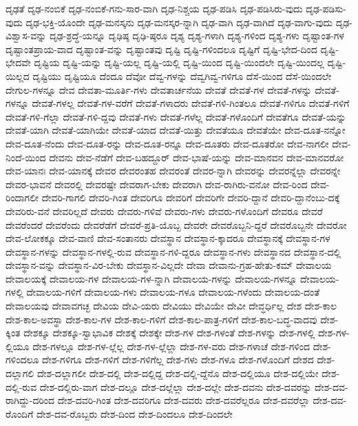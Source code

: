 {ದೃಢತೆ
ದೃಢ-ನಂಬಿಕೆ
ದೃಢ-ನಂಬಿಕೆ-ಗನು-ಸಾರ-ವಾಗಿ
ದೃಢ-ನಿಶ್ಚಯ
ದೃಢ-ಪಡಿಸಿ
ದೃಢ-ಪಡಿಸಿರು-ವುದು
ದೃಢ-ಪಡಿಸು-ವುದು
ದೃಢ-ಭಕ್ತಿ-ಯೊಂದೇ
ದೃಢ-ಮನಸ್ಕನು
ದೃಢ-ಮನಸ್ಕರ-ನ್ನಾಗಿ
ದೃಢ-ವಾಗಿ
ದೃಢ-ವಾಗಿದೆ
ದೃಢ-ವಾಗು-ವುದು
ದೃಢ-ವಿಶ್ವಾಸ-ವನ್ನು
ದೃಢ-ಶ್ರದ್ಧೆ-ಯನ್ನೂ
ದೃಢಿಷ್ಠ
ದೃಢಿ-ಷ್ಠರೂ
ದೃಶ್ಯ
ದೃಶ್ಯ-ಗಳಾಗಿ
ದೃಶ್ಯ-ಗಳಿಂದ
ದೃಶ್ಯ-ಗಳು
ದೃಷ್ಟಾಂತ-ಗಳ
ದೃಷ್ಟಾಂತಪ್ರಾಯ-ವಾದ
ದೃಷ್ಟಾಂತ-ವನ್ನು
ದೃಷ್ಟಾಂತವು
ದೃಷ್ಟಿ
ದೃಷ್ಟಿ-ಗಳಿಂದಲೂ
ದೃಷ್ಟಿಗೆ
ದೃಷ್ಟಿ-ಭೇದ-ದಿಂದ
ದೃಷ್ಟಿ-ಭೇದವೇ
ದೃಷ್ಟಿಯ
ದೃಷ್ಟಿ-ಯನ್ನು
ದೃಷ್ಟಿ-ಯಲ್ಲ
ದೃಷ್ಟಿ-ಯಲ್ಲಿ
ದೃಷ್ಟಿ-ಯಿಂದ
ದೃಷ್ಟಿ-ಯಿಂದಲೇ
ದೃಷ್ಟಿ-ಯಿಂದಲ್ಲ
ದೃಷ್ಟಿ-ಯಿಲ್ಲದ
ದೃಷ್ಟಿಯು
ದೃಷ್ಟಿಯೂ
ದೆಂದೂ
ದೆವೋ
ದೆವ್ವ-ಗಳನ್ನು
ದೆವ್ವಗಿವ್ವ-ಗಳಿಗೂ
ದೆಸೆ-ಯಿಂದ
ದೆಸೆ-ಯಿಂದಲೇ
ದೇಗುಲ-ಗಳನ್ನೂ
ದೇವ
ದೇವತಾ-ಮೂರ್ತಿ-ಗಳು
ದೇವತಾರ್ಚನೆಯ
ದೇವತೆ
ದೇವತೆ-ಗಳ
ದೇವತೆ-ಗಳನ್ನು
ದೇವತೆ-ಗಳನ್ನೂ
ದೇವತೆ-ಗಳಲ್ಲ
ದೇವತೆ-ಗಳ-ವರೆಗೆ
ದೇವತೆ-ಗಳಾದರು
ದೇವತೆ-ಗಳಿ-ಗಿಂತಲೂ
ದೇವತೆ-ಗಳಿಗೂ
ದೇವತೆ-ಗಳಿಗೆ
ದೇವತೆ-ಗಳಿ-ಗೆಲ್ಲಾ
ದೇವತೆ-ಗಳಿ-ದ್ದವು
ದೇವತೆ-ಗಳು
ದೇವತೆ-ಗಳೆಲ್ಲ
ದೇವತೆ-ಗಳೊಂದಿಗೆ
ದೇವತೆಗೂ
ದೇವತೆ-ಯನ್ನು
ದೇವತೆ-ಯಾಗಿ
ದೇವತೆ-ಯಾಗಿಯೇ
ದೇವತೆ-ಯಾದ
ದೇವತೆ-ಯಿತ್ತು
ದೇವತೆಯೂ
ದೇವತೆಯೇ
ದೇವ-ದೂತ-ನನ್ನೋ
ದೇವ-ದೂತ-ನೆಂದು
ದೇವ-ದೂತ-ರನ್ನು
ದೇವ-ದೂತ-ರನ್ನೂ
ದೇವ-ದೂತರು
ದೇವ-ದೂತರೋ
ದೇವ-ನಾಗಲೀ
ದೇವ-ನಿಂದೆ-ಯಿಂದ
ದೇವನು
ದೇವ-ನೆಡೆಗೆ
ದೇವ-ಬಹದ್ದೂರ್
ದೇವ-ಭಾಷೆ-ಯನ್ನು
ದೇವ-ಮಾನವನ
ದೇವ-ಮಾನವರೋ
ದೇವ-ಯಾನಃ
ದೇವ-ಯಾನಕ್ಕೆ
ದೇವರ
ದೇವರಂತಹ
ದೇವರಂತೆ
ದೇವರ-ನ್ನಾಗಿ
ದೇವರನ್ನು
ದೇವರನ್ನೆಲ್ಲಾ
ದೇವರನ್ನೇ
ದೇವರ-ಭಾವನೆ
ದೇವರಲ್ಲಿ
ದೇವರಷ್ಟೇ
ದೇವರಾಗ-ಬೇಕು
ದೇವರಾಗಿ
ದೇವ-ರಾಗಿರು-ವನೋ
ದೇವ-ರಿಂದ
ದೇವ-ರಿಂದಾಗಲೀ
ದೇವರಿ-ಗಾಗಲಿ
ದೇವರಿ-ಗಿಂತ
ದೇವರಿಗೂ
ದೇವರಿಗೆ
ದೇವರಿಗೇ
ದೇವರಿ-ದ್ದಾನೆ
ದೇವರಿ-ದ್ದಾನೆಂಬು-ದಕ್ಕೆ
ದೇವರಿರು-ವನೆ
ದೇವರಿಲ್ಲದೆ
ದೇವರು
ದೇವರು-ಗಳಿವೆ
ದೇವರು-ಗಳು
ದೇವರು-ಗಳೊಂದಿಗೆ
ದೇವರೂ
ದೇವರೆ
ದೇವರೆಂದರೆ
ದೇವರೆಂದು
ದೇವರೆಡೆಗೆ
ದೇವರೆ-ಪ್ರತಿ-ಯೊಬ್ಬ
ದೇವರೇ
ದೇವರೊಬ್ಬನಿ-ದ್ದರೆ
ದೇವರೊಬ್ಬನೇ
ದೇವರೋ
ದೇವ-ಲೋಕಕ್ಕೂ
ದೇವ-ವಾಣಿ
ದೇವ-ಸಂತಾನರು
ದೇವಸ್ಥಾನ
ದೇವಸ್ಥಾನ-ಕ್ಕಾದರೂ
ದೇವಸ್ಥಾನಕ್ಕೆ
ದೇವಸ್ಥಾನ-ಗಳ
ದೇವಸ್ಥಾನ-ಗಳನ್ನು
ದೇವಸ್ಥಾನ-ಗಳಲ್ಲಿ-ರುವ
ದೇವಸ್ಥಾನ-ಗಳಿ-ದ್ದರೂ
ದೇವಸ್ಥಾನ-ಗಳು
ದೇವಸ್ಥಾನದ
ದೇವಸ್ಥಾನ-ದಲ್ಲಿ
ದೇವಸ್ಥಾನ-ವನ್ನು
ದೇವಸ್ಥಾನ-ವಿರ-ಬೇಕು
ದೇವಸ್ಥಾನ-ವಿಲ್ಲದೇ
ದೇವಾ
ದೇವಾನು-ಗ್ರಹ-ಹೇತು-ಕಮ್
ದೇವಾಲಯ
ದೇವಾಲಯಕ್ಕೆ
ದೇವಾಲಯ-ಗಳ
ದೇವಾಲಯ-ಗಳ-ನ್ನಾಗಿ
ದೇವಾಲಯ-ಗಳನ್ನು
ದೇವಾಲಯ-ಗಳನ್ನೂ
ದೇವಾಲಯ-ಗಳಲ್ಲಿ
ದೇವಾಲಯ-ಗಳಿಗೆ
ದೇವಾಲಯ-ಗಳು
ದೇವಾಲಯ-ಗಳೂ
ದೇವಾಲಯ-ಗಳೆಂದು
ದೇವಾಲಯ-ದಂತೆ
ದೇವಾಲಯವು
ದೇವಾವಗಚ್ಛ
ದೇವಿಯ
ದೇವಿ-ಯರು
ದೇವಿಯು
ದೇವಿಯೇ
ದೇವೀ
ದೇವ್ಧರ್ಧಿಲ್ಲ
ದೇಶ
ದೇಶ-ಕಾಲ
ದೇಶ-ಕಾಲ-ಅವಸ್ಥಾ
ದೇಶ-ಕಾಲ-ಗಳ
ದೇಶ-ಕಾಲ-ಗಳಿಗೆ
ದೇಶ-ಕಾಲ-ಪಾತ್ರ-ಗಳಿಗೆ
ದೇಶ-ಕಾಲ-ಬದ್ಧ-ವಾದವು
ದೇಶ-ಕ್ಕಿಂತ
ದೇಶಕ್ಕೂ
ದೇಶಕ್ಕೂ-ಸ್ವಾಭಾವಿಕ
ದೇಶಕ್ಕೆ
ದೇಶಕ್ಕೇ
ದೇಶ-ಗಳ
ದೇಶ-ಗಳಂತೆ
ದೇಶ-ಗಳನ್ನು
ದೇಶ-ಗಳಲ್ಲಿ
ದೇಶ-ಗಳ-ಲ್ಲಿಯೂ
ದೇಶ-ಗಳಲ್ಲೂ
ದೇಶ-ಗಳ-ಲ್ಲೆಲ್ಲ
ದೇಶ-ಗಳ-ಲ್ಲೆಲ್ಲಾ
ದೇಶ-ಗಳ-ವರು
ದೇಶ-ಗಳಾಚೆ
ದೇಶ-ಗಳಿಂದ
ದೇಶ-ಗಳಿಂದಲೂ
ದೇಶ-ಗಳಿಗೂ
ದೇಶ-ಗಳಿಗೆ
ದೇಶ-ಗಳಿಗೆಲ್ಲ
ದೇಶ-ಗಳು
ದೇಶ-ಗಳೂ
ದೇಶ-ಗಳೊಂದಿಗೆ
ದೇಶದ
ದೇಶ-ದಲ್ಲಾಗಲಿ
ದೇಶ-ದಲ್ಲಾಗಲೀ
ದೇಶ-ದಲ್ಲಿ
ದೇಶ-ದಲ್ಲಿದ್ದ
ದೇಶ-ದಲ್ಲಿ-ದ್ದೆನೊ
ದೇಶ-ದಲ್ಲಿಯೂ
ದೇಶ-ದಲ್ಲಿಯೇ
ದೇಶ-ದಲ್ಲಿ-ರುವ
ದೇಶ-ದಲ್ಲಿರು-ವಾಗ
ದೇಶ-ದಲ್ಲೂ
ದೇಶ-ದಲ್ಲೆಲ್ಲಾ
ದೇಶ-ದಲ್ಲೇ
ದೇಶ-ದವನು
ದೇಶ-ದವರನ್ನು
ದೇಶ-ದವ-ರಾಗಿದ್ದು-ದರಿಂದ
ದೇಶ-ದವರಿ-ಗಿಂತ
ದೇಶ-ದವರಿಗೂ
ದೇಶ-ದವರು
ದೇಶ-ದವರೆಲ್ಲರೂ
ದೇಶ-ದವರೆಲ್ಲಾ
ದೇಶ-ದವ-ರೊಂದಿಗೆ
ದೇಶ-ದವ-ರೊಬ್ಬರು
ದೇಶ-ದಿಂದ
ದೇಶ-ದಿಂದಲೂ
ದೇಶ-ದಿಂದಲೇ
}
